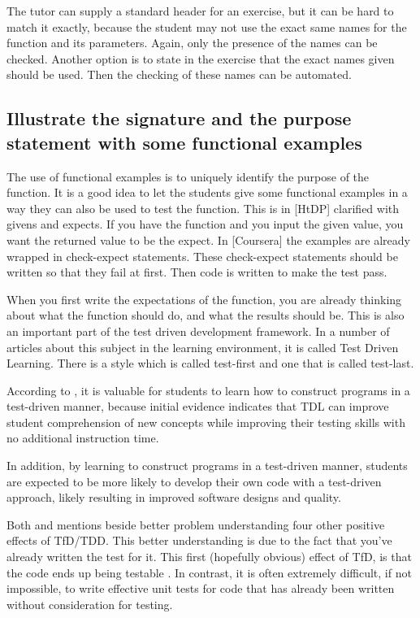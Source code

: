 The \gls{tutor} can supply a standard header for an exercise, but it can be hard to
match it exactly, because the \gls{student} may not use the exact same names for
the function and its parameters. Again, only the presence of the names can be checked.
Another option is to state in the exercise that the exact names given should be used.
Then the checking of these names can be automated.



\subsection{Illustrate the signature and the purpose statement with some functional examples}

The use of functional examples is to uniquely identify the purpose of the
function.
It is a good idea to let the students give some functional examples in a way
they can also be used to test the function.
This is in [HtDP] clarified with givens and expects. If you have the function
and you input the given value, you want the returned value to be the expect.
In [Coursera] the examples are already wrapped in check-expect statements.
These check-expect statements should be written so that they fail at first.
Then \gls{code} is written to make the test pass.

When you first write the expectations of the function, you are already thinking
about what the function should do, and what the results should be. This is also
an important part of the test driven development framework. In a number of articles
about this subject in the learning environment, it is called Test Driven Learning.
There is a style which is called test-first and one that is called test-last.


According to \citep{janzen_test-driven_2006}, it is valuable for \glspl{student} 
to learn how to construct programs in a test-driven manner, because initial
evidence indicates that TDL can improve \gls{student} comprehension of new
concepts while improving their testing skills with no additional instruction time. 

In addition, by learning to construct programs in a test-driven manner,
students are expected to be more likely to develop their
own \gls{code} with a test-driven approach, likely resulting in
improved software designs and quality.

Both \citep{sommerville_software_2011} and \citep{langr_evolution_2001} mentions
beside better problem understanding four other positive effects of TfD/TDD. This
better understanding is due to the fact that you’ve already written the test for it.
This first (hopefully obvious) effect of TfD, is that the \gls{code} ends up being testable \citep{langr_evolution_2001}. In contrast, it is often extremely difficult, if not impossible, to write effective
unit tests for \gls{code} that has already been written without consideration
for testing.

